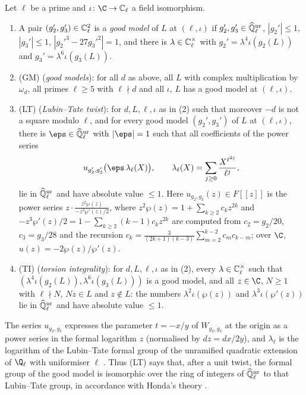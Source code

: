 \begin{definition}\label{pf:reckernel:def-CM}
Let $\ell$ be a prime and $\iota\colon\C\to\reckCl$ a field isomorphism.
\begin{enumerate}
\item A pair $(g_2',g_3')\in\mathbb{C}_\ell^2$ is a \emph{good model} of $L$ at $(\ell,\iota)$ if
  $g_2',g_3'\in\widehat{\mathbb{Q}}{}_\ell^{\mathrm{ur}}$, $|g_2'|\le1$, $|g_3'|\le1$, $|g_2'^3-27g_3'^2|=1$, and there is $\lambda\in\mathbb{C}_\ell^\times$
  with $g_2'=\lambda^4\iota(g_2(L))$ and $g_3'=\lambda^6\iota(g_3(L))$.
\item \textup{(GM)} (\emph{good models}): for all $d$ as above, all $L$ with complex multiplication by $\omega_d$, all primes
  $\ell\ge5$ with $\ell\nmid d$ and all $\iota$, $L$ has a good model at $(\ell,\iota)$.
\item \textup{(LT)} (\emph{Lubin--Tate twist}): for $d,L,\ell,\iota$ as in (2) such that moreover $-d$ is not a square modulo $\ell$, and for
  every good model $(g_2',g_3')$ of $L$ at $(\ell,\iota)$, there is $\eps\in\reckKur$ with $|\eps|=1$ such that all
  coefficients of the power series
  \[
  u_{g_2',g_3'}\bigl(\eps\,\lambda_\ell(X)\bigr),\qquad \lambda_\ell(X)=\sum_{j\ge0}\frac{X^{\ell^{2j}}}{\ell^j},
  \]
  lie in $\widehat{\mathbb{Q}}{}_\ell^{\mathrm{ur}}$ and have absolute value $\le1$. Here $u_{g_2,g_3}(z)\in F[[z]]$ is the power series
  $z\cdot\frac{z^2\wp(z)}{-z^3\wp'(z)/2}$, where $z^2\wp(z)=1+\sum_{k\ge2}c_kz^{2k}$ and
  $-z^3\wp'(z)/2=1-\sum_{k\ge2}(k-1)c_kz^{2k}$ are computed from $c_2=g_2/20$, $c_3=g_3/28$ and the recursion
  $c_k=\frac{3}{(2k+1)(k-3)}\sum_{m=2}^{k-2}c_mc_{k-m}$; over $\C$, $u(z)=-2\wp(z)/\wp'(z)$.
\item \textup{(TI)} (\emph{torsion integrality}): for $d,L,\ell,\iota$ as in (2), every $\lambda\in\mathbb{C}_\ell^\times$ such that
  $(\lambda^4\iota(g_2(L)),\lambda^6\iota(g_3(L)))$ is a good model, and all $z\in\C$, $N\ge1$ with $\ell\nmid N$,
  $Nz\in L$ and $z\notin L$: the numbers $\lambda^2\iota(\wp(z))$ and $\lambda^3\iota(\wp'(z))$ lie in $\widehat{\mathbb{Q}}{}_\ell^{\mathrm{ur}}$ and
  have absolute value $\le1$.
\end{enumerate}
\end{definition}

The series $u_{g_2,g_3}$ expresses the parameter $t=-x/y$ of $W_{g_2,g_3}$ at the origin as a power series in the
formal logarithm $z$ (normalised by $dz=dx/2y$), and $\lambda_\ell$ is the logarithm of the Lubin--Tate formal
group of the unramified quadratic extension of $\Q_\ell$ with uniformiser $\ell$ \cite{LubinTate1965}. Thus
(LT) says that, after a unit twist, the formal group of the good model is isomorphic over the ring of
integers of $\widehat{\mathbb{Q}}{}_\ell^{\mathrm{ur}}$ to that Lubin--Tate group, in accordance with Honda's theory \cite{Honda1970}.

